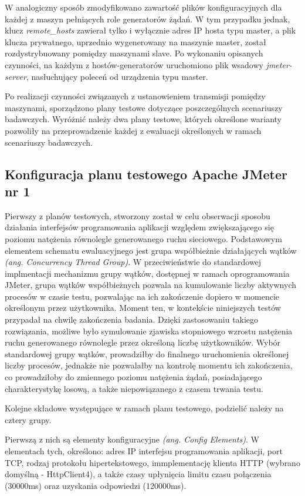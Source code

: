 W analogiczny sposób zmodyfikowano zawartość plików konfiguracyjnych dla każdej z maszyn pełniących role generatorów żądań. W tym przypadku jednak, klucz \textit{remote\_hosts} zawierał tylko i wyłącznie adres IP hosta typu master, a plik klucza prywatnego, uprzednio wygenerowany na maszynie master, został rozdystrybuowany pomiędzy maszynami slave. Po wykonaniu opisanych czynności, na każdym z hostów-generatorów uruchomiono plik wsadowy \textit{jmeter-server}, nasłuchujący poleceń od urządzenia typu master.

Po realizacji czynności związanych z ustanowieniem transmisji pomiędzy maszynami, sporządzono plany testowe dotyczące poszczególnych scenariuszy badawczych. Wyróżnić należy dwa plany testowe, których określone warianty pozwoliły na przeprowadzenie każdej z ewaluacji określonych w ramach scenariuszy badawczych. 

\subsection*{Konfiguracja planu testowego Apache JMeter nr 1}
\label{plan-testowy-1}
Pierwszy z planów testowych, stworzony został w celu obserwacji sposobu działania interfejsów programowania aplikacji względem zwiększającego się poziomu natężenia równolegle generowanego ruchu sieciowego. Podstawowym elementem schematu ewaluacyjnego jest grupa współbieżnie działających wątków \textit{(ang. Concurrency Thread Group)}. W przeciwieństwie do standardowej implmentacji mechanizmu grupy wątków, dostępnej w ramach oprogramowania JMeter, grupa wątków współbieżnych pozwala na kumulowanie liczby aktywnych procesów w czasie testu, pozwalając na ich zakończenie dopiero w momencie określonym przez użytkownika. Moment ten, w kontekście niniejszych testów przypadał na chwilę zakończenia badania. Dzięki zastosowaniu takiego rozwiązania, możliwe było symulowanie zjawiska stopniowego wzrostu natężenia ruchu generowanego równolegle przez określoną liczbę użytkowników. Wybór standardowej grupy wątków, prowadziłby do finalnego uruchomienia określonej liczby procesów, jednakże nie pozwalałby na kontrolę momentu ich zakończenia, co prowadziłoby do zmiennego poziomu natężenia żądań, posiadającego charakterystykę losową, a także niepowiązanego z czasem trwania testu.

Kolejne składowe występujące w ramach planu testowego, podzielić należy na cztery grupy. 

Pierwszą z nich są elementy konfiguracyjne \textit{(ang. Config Elements)}. W elementach tych, określono: adres IP interfejsu programowania aplikacji, port TCP, rodzaj protokołu hipertekstowego, immplementację klienta HTTP (wybrano domyślną - HttpClient4), a także czasy upłynięcia limitu czasu połączenia (30000ms) oraz uzyskania odpowiedzi (120000ms).

